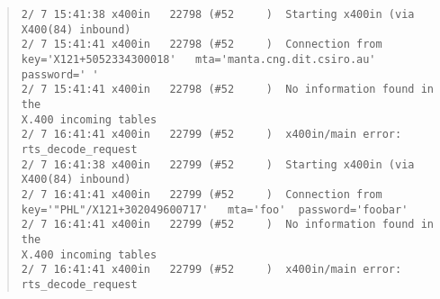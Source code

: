 \begin{quote}\footnotesize\begin{verbatim}
2/ 7 15:41:38 x400in   22798 (#52     )  Starting x400in (via X400(84) inbound)
2/ 7 15:41:41 x400in   22798 (#52     )  Connection from 
key='X121+5052334300018'   mta='manta.cng.dit.csiro.au'  password=' '
2/ 7 15:41:41 x400in   22798 (#52     )  No information found in the 
X.400 incoming tables
2/ 7 16:41:41 x400in   22799 (#52     )  x400in/main error: rts_decode_request
2/ 7 16:41:38 x400in   22799 (#52     )  Starting x400in (via X400(84) inbound)
2/ 7 16:41:41 x400in   22799 (#52     )  Connection from 
key='"PHL"/X121+302049600717'   mta='foo'  password='foobar'
2/ 7 16:41:41 x400in   22799 (#52     )  No information found in the 
X.400 incoming tables
2/ 7 16:41:41 x400in   22799 (#52     )  x400in/main error: rts_decode_request
\end{verbatim}\end{quote}

